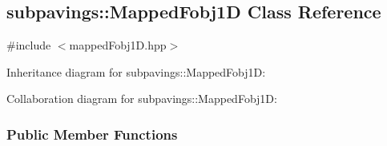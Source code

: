 \hypertarget{classsubpavings_1_1MappedFobj1D}{\subsection{subpavings\-:\-:\-Mapped\-Fobj1\-D \-Class \-Reference}
\label{classsubpavings_1_1MappedFobj1D}
}


{\ttfamily \#include $<$mapped\-Fobj1\-D.\-hpp$>$}



\-Inheritance diagram for subpavings\-:\-:\-Mapped\-Fobj1\-D\-:


\-Collaboration diagram for subpavings\-:\-:\-Mapped\-Fobj1\-D\-:
\subsubsection*{\-Public \-Member \-Functions}
